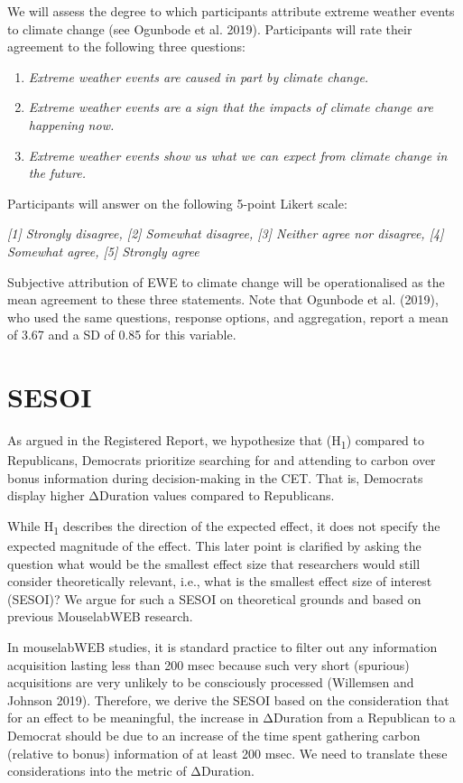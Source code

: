 \documentclass[
  letterpaper,
  DIV=11,
  numbers=noendperiod]{scrartcl}
\begin{document}
We will assess the degree to which participants attribute extreme
weather events to climate change (see Ogunbode et al. 2019).
Participants will rate their agreement to the following three questions:

\begin{enumerate}
\def\labelenumi{\arabic{enumi}.}
\item
  \emph{Extreme weather events are caused in part by climate change.}
\item
  \emph{Extreme weather events are a sign that the impacts of climate
  change are happening now.}
\item
  \emph{Extreme weather events show us what we can expect from climate
  change in the future.}
\end{enumerate}

Participants will answer on the following 5-point Likert scale:

\emph{{[}1{]} Strongly disagree, {[}2{]} Somewhat disagree, {[}3{]}
Neither agree nor disagree, {[}4{]} Somewhat agree, {[}5{]} Strongly
agree}

Subjective attribution of EWE to climate change will be operationalised
as the mean agreement to these three statements. Note that Ogunbode et
al. (2019), who used the same questions, response options, and
aggregation, report a mean of 3.67 and a SD of 0.85 for this variable.

\section{SESOI}\label{sesoi}

As argued in the Registered Report, we hypothesize that
(H\textsubscript{1}) compared to Republicans, Democrats prioritize
searching for and attending to carbon over bonus information during
decision-making in the CET. That is, Democrats display higher ΔDuration
values compared to Republicans.

While H\textsubscript{1} describes the direction of the expected effect,
it does not specify the expected magnitude of the effect. This later
point is clarified by asking the question what would be the smallest
effect size that researchers would still consider theoretically
relevant, i.e., what is the smallest effect size of interest (SESOI)? We
argue for such a SESOI on theoretical grounds and based on previous
MouselabWEB research.

In mouselabWEB studies, it is standard practice to filter out any
information acquisition lasting less than 200 msec because such very
short (spurious) acquisitions are very unlikely to be consciously
processed (Willemsen and Johnson 2019). Therefore, we derive the SESOI
based on the consideration that for an effect to be meaningful, the
increase in ΔDuration from a Republican to a Democrat should be due to
an increase of the time spent gathering carbon (relative to bonus)
information of at least 200 msec. We need to translate these
considerations into the metric of ΔDuration.
\end{document}
